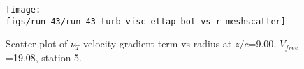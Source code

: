 \begin{figure}[H]
\centering
\texttt{[image: figs/run\_43/run\_43\_turb\_visc\_ettap\_bot\_vs\_r\_meshscatter]}
\caption{Scatter plot of $\nu_T$ velocity gradient term vs radius at $z/c$=9.00, $V_{free}$=19.08, station 5.}
\label{fig:run_43_turb_visc_ettap_bot_vs_r_meshscatter}
\end{figure}


